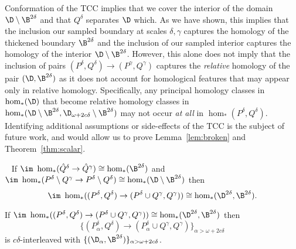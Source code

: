 Conformation of the TCC implies that we cover the interior of the domain $\D\setminus\B^{2\delta}$ and that $Q^\delta$ separates $\D$ which.
As we have shown, this implies that the inclusion our sampled boundary at scales $\delta,\gamma$ captures the homology of the thickened boundary $\B^{2\delta}$ and the inclusion of our sampled interior captures the homology of the interior $\D\setminus\B^{2\delta}$.
However, this alone does not imply that the inclusion of pairs $(P^\delta, Q^\delta)\to (P^\gamma, Q^\gamma)$ captures the \emph{relative} homology of the pair $(\D,\B^{2\delta})$ as it does not account for homological features that may appear only in relative homology.
Specifically, any principal homology classes in $\hom_*(\D)$ that become relative homology classes in $\hom_*(\D\setminus\B^{2\delta}, \D_{\omega +2c\delta}\setminus \B^{2\delta})$ may not occur \emph{at all} in $\hom_*(P^\delta, Q^\delta)$.
Identifying additional assumptions or side-effects of the TCC is the subject of future work, and would allow us to prove Lemma~\ref{lem:broken} and Theorem~\ref{thm:scalar}.



\begin{lemma}~\label{lem:broken}
    If $\im~\hom_*(\hat{Q}^\delta\to\hat{Q}^\gamma)\cong\hom_*(\B^{2\delta})$ and $\im~\hom_*(P^\delta\setminus Q^\gamma \to P^\delta\setminus Q^\delta)\cong \hom_*(\D\setminus\B^{2\delta})$ then
    \[\im~\hom_*((P^\delta, Q^\delta)\to (P^\delta\cup Q^\gamma, Q^\gamma))\cong \hom_*(\D^{2\delta}, \B^{2\delta}). \]
\end{lemma}

\begin{theorem}\label{thm:scalar}
    If $\im~\hom_*((P^\delta, Q^\delta)\to (P^\delta\cup Q^\gamma, Q^\gamma))\cong \hom_*(\D^{2\delta}, \B^{2\delta})$ then \[\{(P_\alpha^\delta, Q^\delta)\to (P_\alpha^\delta\cup Q^\gamma, Q^\gamma)\}_{\alpha > \omega+2c\delta}\] is $c\delta$-interleaved with $\{(\D_\alpha, \B^{2\delta})\}_{\alpha > \omega +2c\delta}$.
\end{theorem}
